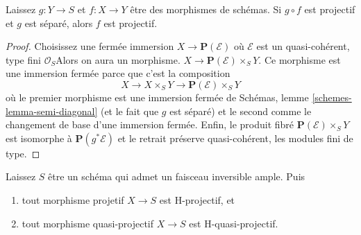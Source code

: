 \begin{lemma}

\label{lemma-projective-permanence}
Laissez $g : Y \to S$ et $f : X \to Y$ être des morphismes de schémas. Si $g \circ f$ est projectif et $g$ est séparé, alors $f$ est projectif.
\end{lemma}

\begin{proof}

Choisissez une fermée immersion $X \to \mathbf{P}(\mathcal{E})$ où $\mathcal{E}$
est un quasi-cohérent, type fini $\mathcal{O}_S$Alors on aura un morphisme. $X \to \mathbf{P}(\mathcal{E}) \times_S Y$. Ce morphisme est une immersion fermée parce que c'est la composition
$$
X \to X \times_S Y \to \mathbf{P}(\mathcal{E}) \times_S Y
$$
où le premier morphisme est une immersion fermée de Schémas, lemme \ref{schemes-lemma-semi-diagonal}
(et le fait que $g$ est séparé) et le second comme le changement de base d'une immersion fermée. Enfin, le produit fibré $\mathbf{P}(\mathcal{E}) \times_S Y$
est isomorphe à $\mathbf{P}(g^*\mathcal{E})$ et le retrait préserve quasi-cohérent, les modules fini de type.

\end{proof}

\begin{lemma}

\label{lemma-projective-over-quasi-projective-is-H-projective}
Laissez $S$ être un schéma qui admet un faisceau inversible ample. Puis
\begin{enumerate}
\item tout morphisme projetif $X \to S$ est H-projectif, et
\item tout morphisme quasi-projectif $X \to S$ est H-quasi-projectif.
\end{enumerate}

\end{lemma}

